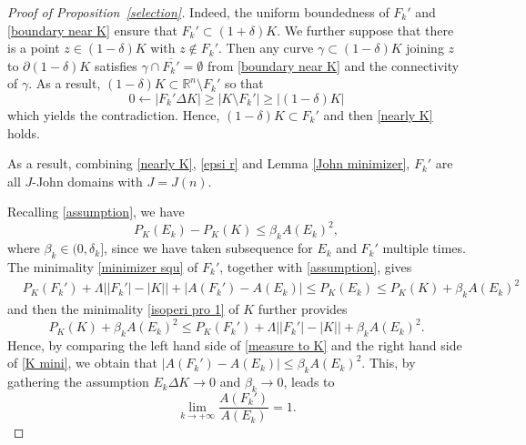 \documentclass[reqno,11pt]{amsart}
\numberwithin{equation}{section}
\theoremstyle{remark}
\begin{document}
\begin{proof}[Proof of Proposition~\ref{selection}]
 Indeed, the uniform boundedness of $F_k'$ and \eqref{boundary near K} ensure that $F_k' \subset (1+\delta) K$. We further suppose that there is a point $z\in (1-\delta)K$ with $z\notin F_k'$. Then any curve $\gamma\subset (1-\delta)K$ joining $z$ to $\partial (1-\delta)K$ satisfies $\gamma\cap \overline{F_k'}= \emptyset$ from \eqref{boundary near K} and the connectivity of $\gamma$. As a result,  $ (1-\delta) K\subset \mathbb R^n\setminus F_k'$ so that 
 $$0\gets |F_k'\Delta K|\ge |K\setminus F_k'|\ge |(1-\delta)K|$$
 which yields the contradiction. Hence, $(1-\delta)K\subset F_k'$ and then \eqref{nearly K}  holds. 

 As a result, combining \eqref{nearly K}, \eqref{epsi r} and Lemma \ref{John minimizer},  $F_k'$ are all $J$-John domains with $J=J(n)$.  

\medskip
 Recalling \eqref{assumption}, we have
 $$P_K(E_k)-P_K(K)\le \beta_k A(E_k)^2,$$ 
 where $\beta_k\in(0,\delta_k]$, 
since we have taken subsequence for $E_k$ and $F_k'$ multiple times.
 The minimality \eqref{minimizer squ} of $F_k'$, together with \eqref{assumption}, gives
 \begin{align}\label{measure to K}
     & P_K(F_k')+\Lambda\big||F_k'|-|K|\big|+\big|A(F_k')-A(E_k)\big| \le  P_K(E_k)\le P_K(K)+\beta_kA(E_k)^2 
 \end{align}
 and then the minimality \eqref{isoperi pro 1} of $K$ further provides
 \begin{equation}\label{K mini}
     P_K(K)+\beta_k A(E_k)^2\le P_K(F_k')+\Lambda\big||F_k'|-|K|\big|+\beta_kA(E_k)^2.
 \end{equation}
Hence, by comparing the left hand side of \eqref{measure to K} and the right hand side of \eqref{K mini},  we obtain that 
 $\big|A(F_k')-A(E_k)\big|\le \beta_k A(E_k)^2$. This, by gathering the assumption $E_k\Delta K\to 0$ 
 and $\beta_k\to 0$, leads to
 \begin{equation}\label{difference EF}
     \lim_{k\to+\infty}\frac{A(F_k')}{A(E_k)}=1.
 \end{equation}


\end{proof}
\end{document}
